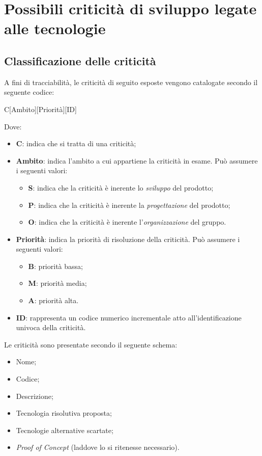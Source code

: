 \documentclass[./../Technology Baseline.tex]{subfiles}
\begin{document}
	
\chapter{Possibili criticità di sviluppo legate alle tecnologie}

\section{Classificazione delle criticità}

A fini di tracciabilità, le criticità di seguito esposte vengono catalogate secondo il seguente codice:

\begin{center}
	C[Ambito][Priorità][ID]
\end{center}

Dove:

\begin{itemize}
	\item \textbf{C}: indica che si tratta di una criticità;
	\item \textbf{Ambito}: indica l'ambito a cui appartiene la criticità in esame. Può assumere i seguenti valori:
	\begin{itemize}
		\item \textbf{S}: indica che la criticità è inerente lo \textit{sviluppo} del prodotto;
		\item \textbf{P}: indica che la criticità è inerente la \textit{progettazione} del prodotto;
		\item \textbf{O}: indica che la criticità è inerente l'\textit{organizzazione} del gruppo.
	\end{itemize}
	\item \textbf{Priorità}: indica la priorità di risoluzione della criticità. Può assumere i seguenti valori:
	\begin{itemize}
		\item \textbf{B}: priorità bassa;
		\item \textbf{M}: priorità media;
		\item \textbf{A}: priorità alta.
	\end{itemize}
	\item \textbf{ID}: rappresenta un codice numerico incrementale atto all'identificazione univoca della criticità.
\end{itemize}

\noindent Le criticità sono presentate secondo il seguente schema: 

\begin{itemize}
	\item Nome;
	\item Codice;
	\item Descrizione;
	\item Tecnologia risolutiva proposta;
	\item Tecnologie alternative scartate;
	\item \textit{Proof of Concept} (laddove lo si ritenesse necessario).
\end{itemize}
\end{document}
